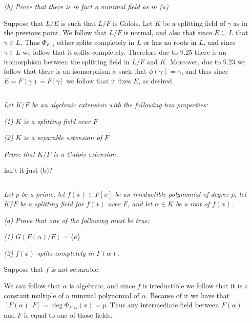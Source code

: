 \documentclass[11pt,oneside,titlepage]{book}
\newcommand{\set}[1]{\{ #1 \}}
\begin{document}
\textit{(b) Prove that there is in fact a minimal field as in (a)}

Suppose that $L/E$ is such that $L/F$ is Galois. Let $K$ be a
splitting field of $\gamma$ as in the previous point. We follow that
$L/F$ is normal, and also that since $E \subseteq L$ that $\gamma \in
L$. Thus $\Phi_{F, \gamma}$ either splits completely in $L$ or has no
roots in $L$, and since $\gamma \in L$ we follow that it splits
completely. Therefore due to 9.25 there is an isomorphism between the
splitting field in $L/F$ and $K$. Moreover, due to 9.23 we follow that
there is an isomorphism $\phi$ such that $\phi(\gamma) = \gamma$, and
thus since $E = F(\gamma) = F[\gamma]$ we follow that it fixes $E$,
as desired.

\subsection{}

\textit{Let $K/F$ be an algebraic extension with the following two
  properties:}

\textit{(1) $K$ is a splitting field over $F$}

\textit{(2) $K$ is a separable extension of $F$}


\textit{Prove that $K/F$ is a Galois extension. }

Isn't it just (b)?

\subsection{}

\textit{Let $p$ be a prime, let $f(x) \in F[x]$ be an irreductible
  polynomial of degree $p$, let $K/F$ be a splitting field for $f(x)$
  over $F$, and let $\alpha \in K$ be a root of $f(x)$. }

\textit{(a) Prove that one of the following must be true:}

\textit{(1) $G(F(\alpha)/F) = \set{e}$}

\textit{(2) $f(x)$ splits completely in $F(\alpha)$.}

Suppose that $f$ is not separable.

We can follow that $\alpha$ is algebraic, and since $f$ is
irreductible we follow that it is a constant multiple of a minimal
polynomial of $\alpha$. Because of it we have that $[F(\alpha):F] =
\deg \Phi_{F, \alpha}(x) = p$. Thus any intermediate field between $F(\alpha)$ and
$F$ is equal to one of those fields.
\end{document}
